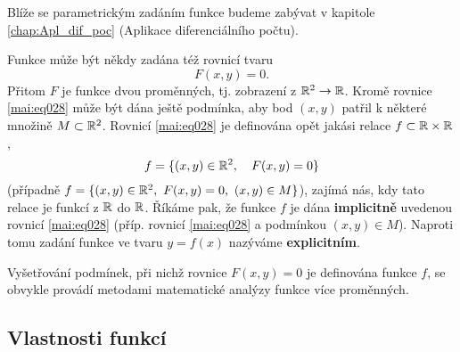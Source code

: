 {      %
        
      
      Blíže se parametrickým zadáním funkce budeme zabývat v kapitole \ref{chap:Apl_dif_poc}
      (Aplikace diferenciálního počtu).
      
      Funkce může být někdy zadána též rovnicí tvaru 
      \begin{equation}\label{mai:eq028}
        F(x,y) = 0.
      \end{equation}
      Přitom $F$ je funkce dvou proměnných, tj. zobrazení z $\mathbb{R}^2\rightarrow\mathbb{R}$. Kromě 
      rovnice \ref{mai:eq028} může být dána ještě podmínka, aby bod $(x,y)$ patřil k některé 
      množině $M\subset\mathbb{R}^2$. Rovnicí \ref{mai:eq028} je definována opět jakási relace 
      $f\subset\mathbb{R}\times\mathbb{R}$,
      \begin{equation}
        f = \{(x,y)\in\mathbb{R}^2,\quad F(x,y)=0 \}
      \end{equation}
      (případně $f = \{(x,y)\in\mathbb{R}^2,\ F(x,y)=0,\ (x,y)\in M \}$), zajímá nás, kdy tato relace 
      je funkcí z $\mathbb{R}$ do $\mathbb{R}$. Říkáme pak, že funkce $f$ je dána \textbf{implicitně} 
      uvedenou rovnicí \ref{mai:eq028} (příp. rovnicí \ref{mai:eq028} a podmínkou $(x,y)\in 
      M$). Naproti tomu zadání funkce ve tvaru $y=f(x)$ nazýváme \textbf{explicitním}.

        
      
      Vyšetřování podmínek, při nichž rovnice $F(x,y)=0$ je definována funkce $f$, se obvykle 
      provádí metodami matematické analýzy funkce více proměnných. 
          
    \subsection{Vlastnosti funkcí}\label{MA1:subsec_vlastnosti_funkce}
}
